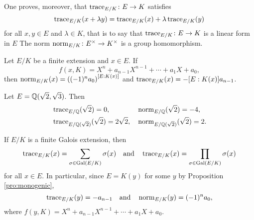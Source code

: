 One proves, moreover, that  
$\operatorname{trace}_{E/K}\colon E\to K$ 
satisfies
\[
\operatorname{trace}_{E/K}(x+\lambda y)=
\operatorname{trace}_{E/K}(x)+\lambda\operatorname{trace}_{E/K}(y)
\]
for all $x,y\in E$ and $\lambda\in K$, that is to say that 
$\operatorname{trace}_{E/K}\colon E\to K$ 
is a 
linear form in $E$ The norm  
$\operatorname{norm}_{E/K}\colon E^{\times}\to K^{\times}$ 
is a group homomorphism. 

\begin{exercise}
        Let $E/K$ be a finite extension and
        $x\in E$. If
        \[
        f(x,K)=X^n+a_{n-1}X^{n-1}+\cdots+a_1X+a_0,
        \]
        then 
        $\operatorname{norm}_{E/K}(x)=\left((-1)^na_0\right)^{[E:K(x)]}$ and 
        $\operatorname{trace}_{E/K}(x)=-[E:K(x)]a_{n-1}$. 
\end{exercise}

\begin{example}
    Let $E=\mathbb{Q}(\sqrt{2},\sqrt{3})$. Then 
    \begin{align*}
    &\operatorname{trace}_{E/\mathbb{Q}}(\sqrt{2})=0,
    &&
    \operatorname{norm}_{E/\mathbb{Q}}(\sqrt{2})=-4,\\
    &\operatorname{trace}_{E/\mathbb{Q}(\sqrt{2})}(\sqrt{2})=2\sqrt{2},
    &&\operatorname{norm}_{E/\mathbb{Q}(\sqrt{2})}(\sqrt{2})=2.    
    \end{align*}
\end{example}

\begin{example}
    If $E/K$ is a finite Galois extension, then 
    \[
    \operatorname{trace}_{E/K}(x)=\sum_{\sigma\in\operatorname{Gal}(E/K)}\sigma(x)
    \quad\text{and}\quad
    \operatorname{trace}_{E/K}(x)=\prod_{\sigma\in\operatorname{Gal}(E/K)}\sigma(x)
    \]
    for all $x\in E$. In particular, since $E=K(y)$ for some
    $y$ by Proposition \ref{pro:monogenic}, 
    \[
    \operatorname{trace}_{E/K}(y)=-a_{n-1}
    \quad\text{and}\quad
    \operatorname{norm}_{E/K}(y)=(-1)^na_0,
    \]
    where
    $f(y,K)=X^n+a_{n-1}X^{n-1}+\cdots+a_1X+a_0$.
\end{example}        
